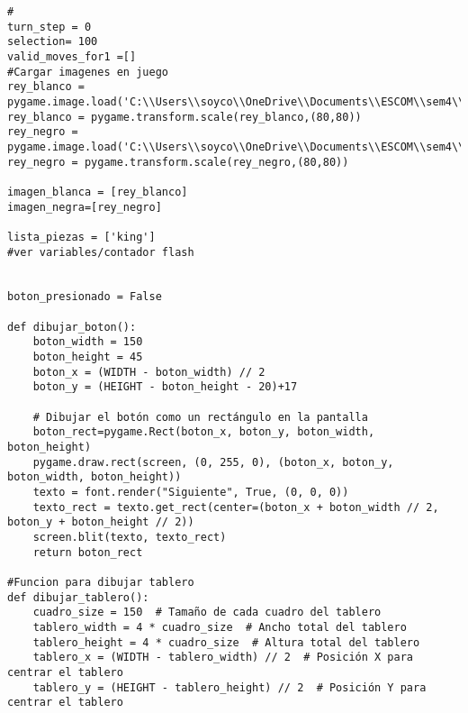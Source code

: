 \begin{lstlisting}
#
turn_step = 0
selection= 100
valid_moves_for1 =[]
#Cargar imagenes en juego
rey_blanco = pygame.image.load('C:\\Users\\soyco\\OneDrive\\Documents\\ESCOM\\sem4\\Teoria\\P2\\Chess\\img\\white_king.png')
rey_blanco = pygame.transform.scale(rey_blanco,(80,80))
rey_negro = pygame.image.load('C:\\Users\\soyco\\OneDrive\\Documents\\ESCOM\\sem4\\Teoria\\P2\\Chess\\img\\black_king.png')
rey_negro = pygame.transform.scale(rey_negro,(80,80))

imagen_blanca = [rey_blanco]
imagen_negra=[rey_negro]

lista_piezas = ['king']
#ver variables/contador flash


boton_presionado = False

def dibujar_boton():
    boton_width = 150
    boton_height = 45
    boton_x = (WIDTH - boton_width) // 2
    boton_y = (HEIGHT - boton_height - 20)+17

    # Dibujar el botón como un rectángulo en la pantalla
    boton_rect=pygame.Rect(boton_x, boton_y, boton_width, boton_height)
    pygame.draw.rect(screen, (0, 255, 0), (boton_x, boton_y, boton_width, boton_height))
    texto = font.render("Siguiente", True, (0, 0, 0))
    texto_rect = texto.get_rect(center=(boton_x + boton_width // 2, boton_y + boton_height // 2))
    screen.blit(texto, texto_rect)
    return boton_rect
    
#Funcion para dibujar tablero
def dibujar_tablero():
    cuadro_size = 150  # Tamaño de cada cuadro del tablero
    tablero_width = 4 * cuadro_size  # Ancho total del tablero
    tablero_height = 4 * cuadro_size  # Altura total del tablero
    tablero_x = (WIDTH - tablero_width) // 2  # Posición X para centrar el tablero
    tablero_y = (HEIGHT - tablero_height) // 2  # Posición Y para centrar el tablero
    

\end{lstlisting}
